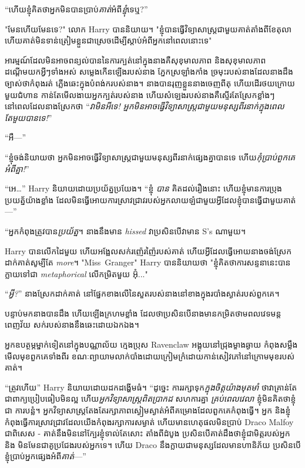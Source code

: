 {{{{{{{“ហើយខ្ញុំគិតថាអ្នកមិនបានប្រាប់\emph{គាត់}អំពី\emph{ខ្ញុំ}ទេឬ?”

"មែនហើយមែនទេ?" លោក Harry បាននិយាយ។ "ខ្ញុំបានធ្វើវិទ្យាសាស្ត្រជាមួយគាត់តាំងពីខែតុលា ហើយគាត់មិនទាន់ត្រៀមខ្លួនជាស្រេចដើម្បីស្តាប់អំពីអ្នកនៅពេលនោះទេ"

អារម្មណ៍ដែលមិនអាចពន្យល់បាននៃការក្បត់នៅក្នុងនាងគឺសុខុមាលភាព និងសុខុមាលភាព ដណ្តើមយកអ្វីៗទាំងអស់ សម្លេងកើនឡើងរបស់នាង ភ្នែកស្រឡាំងកាំង ច្រមុះរបស់នាងដែលនាងដឹងច្បាស់ថាកំពុងរត់ ភ្លើងឆេះក្នុងបំពង់ករបស់នាង។ នាងបានរុញខ្លួននាងចេញពីតុ ហើយដើរថយក្រោយមួយជំហាន កាន់តែមើលងាយអ្នកក្បត់របស់នាង ហើយសំឡេងរបស់នាងគឺស្ទើរតែស្រែកខ្លាំងៗ នៅពេលដែលនាងស្រែកថា “\emph{វាមិនអីទេ! អ្នកមិនអាចធ្វើវិទ្យាសាស្ត្រជាមួយមនុស្សពីរនាក់ក្នុងពេលតែមួយបានទេ!}”

“អឺ—”

“ខ្ញុំចង់និយាយថា អ្នកមិនអាចធ្វើវិទ្យាសាស្ត្រជាមួយមនុស្សពីរនាក់ផ្សេងគ្នាបានទេ ហើយ\emph{កុំប្រាប់ពួកគេអំពីគ្នា!}”

“អេ…” Harry និយាយដោយប្រយ័ត្នប្រយែង។ “ខ្ញុំ \emph{បាន} គិតដល់រឿងនោះ ហើយខ្ញុំមានការប្រុងប្រយត្ន័យ៉ាងខ្លាំង ដែលមិនធ្វើអោយការស្រាវជ្រាវរបស់អ្នកលាយឡំជាមួយអ្វីដែលខ្ញុំបានធ្វើជាមួយគាត់—”

“អ្នកកំពុងត្រូវបាន\emph{ប្រយ័ត្ន}។ នាងនឹងមាន \emph{hissed} វាប្រសិនបើវាមាន S's ណាមួយ។

Harry បានលើកដៃមួយ ហើយអង្អែលសក់រញ៉េរញ៉ៃរបស់គាត់ ហើយអ្វីដែលធ្វើអោយនាងចង់ស្រែកដាក់គាត់សូម្បីតែ \emph{more}។ "Miss~Granger" Harry បាននិយាយថា "ខ្ញុំគិតថាការសន្ទនានេះបានក្លាយទៅជា\emph{ metaphorical} លើកម្រិតមួយ អ៊ុំ..."

“\emph{អ្វី?}” នាងស្រែកដាក់គាត់ នៅផ្នែកខាងលើនៃសួតរបស់នាងនៅខាងក្នុងរបាំងស្ងាត់របស់ពួកគេ។

បន្ទាប់មកនាងបានដឹង ហើយឡើងក្រហមខ្លាំង ដែលថាប្រសិនបើនាងមានកម្រិតថាមពលវេទមន្តពេញវ័យ សក់របស់នាងនឹងឆេះដោយឯកឯង។

អ្នកឧបត្ថម្ភម្នាក់ទៀតនៅក្នុងបណ្ណាល័យ ក្មេងប្រុស Ravenclaw អង្គុយនៅជ្រុងម្ខាងឆ្ងាយ កំពុងសម្លឹងមើលមុខពួកគេទាំងពីរ ខណៈព្យាយាមលាក់បាំងដោយក្រៀមក្រំដោយកាន់សៀវភៅនៅក្រោមមុខរបស់គាត់។

“ត្រូវហើយ” Harry និយាយដោយដកដង្ហើមធំ។ “ដូច្នេះ ការរក្សាទុក\emph{ក្នុងចិត្តយ៉ាងមុតមាំ} ថាវាគ្រាន់តែជាពាក្យប្រៀបធៀបមិនល្អ ហើយ\emph{អ្នកវិទ្យាសាស្ត្រពិតប្រាកដ} សហការគ្នា \emph{គ្រប់ពេលវេលា} ខ្ញុំមិនគិតថាខ្ញុំជា ការបន្លំ។ អ្នកវិទ្យាសាស្ត្រតែងតែរក្សាភាពស្ងៀមស្ងាត់អំពីគម្រោងដែលពួកគេកំពុងធ្វើ។ អ្នក និងខ្ញុំកំពុងធ្វើការស្រាវជ្រាវដែលយើងកំពុងរក្សាការសម្ងាត់ ហើយមានហេតុផលមិនប្រាប់ Draco Malfoy ជាពិសេស - គាត់នឹងមិននៅក្បែរខ្ញុំទាល់តែសោះ តាំងពីដំបូង ប្រសិនបើគាត់ដឹងថាខ្ញុំជាមិត្តរបស់អ្នក និង មិនមែនជាគូប្រជែងរបស់អ្នកទេ។ ហើយ Draco នឹងក្លាយជាមនុស្សដែលមានហានិភ័យ ប្រសិនបើខ្ញុំប្រាប់អ្នកផ្សេងអំពី\emph{គាត់}—”

}}}}}}}
